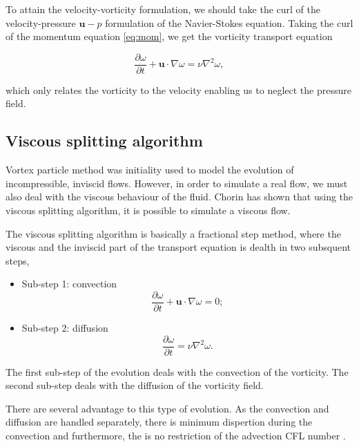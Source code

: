 To attain the velocity-vorticity formulation, we should take the curl of the velocity-pressure $\mathbf{u}-p$ formulation of the Navier-Stokes equation. Taking the curl of the momentum equation \ref{eq:mom}, we get the vorticity transport equation

	\begin{equation}
	\frac{\partial \omega}{\partial t} + \mathbf{u}\cdot\nabla\omega = \nu \nabla^2 \omega,
	\end{equation}

which only relates the vorticity to the velocity enabling us to neglect the pressure field.


\subsection{Viscous splitting algorithm}
Vortex particle method was initiality used to model the evolution of incompressible, inviscid flows. However, in order to simulate a real flow, we must also deal with the viscous behaviour of the fluid. Chorin \cite{Chorin1973} has shown that using the viscous splitting algorithm, it is possible to simulate a viscous flow. 

The viscous splitting algorithm is basically a fractional step method, where the viscous and the inviscid part of the transport equation is dealth in two subsquent steps, 

	\begin{itemize}
	\item Sub-step 1: convection
		\begin{equation}
		\frac{\partial\omega}{\partial t} + \mathbf{u}\cdot\nabla\omega=0;
		\label{eq:convectionEulerian}
		\end{equation}
		
	\item Sub-step 2: diffusion
		\begin{equation}
		\frac{\partial\omega}{\partial t} = \nu\nabla^2\omega.
		\end{equation}
	
	\end{itemize}

The first sub-step of the evolution deals with the convection of the vorticity. The second sub-step deals with the diffusion of the vorticity field. 

There are several advantage to this type of evolution. As the convection and diffusion are handled separately, there is minimum dispertion during the convection and furthermore, the is no restriction of the advection CFL number \cite{Wee2006}.

